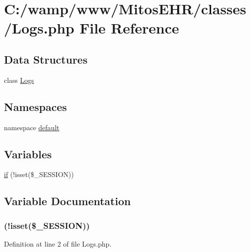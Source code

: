 \hypertarget{_logs_8php}{\section{\-C\-:/wamp/www/\-Mitos\-E\-H\-R/classes/\-Logs.php \-File \-Reference}
\label{_logs_8php}
}
\subsection*{\-Data \-Structures}
\begin{DoxyCompactItemize}
\item 
class \hyperlink{class_logs}{\-Logs}
\end{DoxyCompactItemize}
\subsection*{\-Namespaces}
\begin{DoxyCompactItemize}
\item 
namespace \hyperlink{namespacedefault}{default}
\end{DoxyCompactItemize}
\subsection*{\-Variables}
\begin{DoxyCompactItemize}
\item 
\hyperlink{_logs_8php_a8ceca98aa29914fd2479a84a8d2242fb}{if} (!isset(\$\-\_\-\-S\-E\-S\-S\-I\-O\-N))
\end{DoxyCompactItemize}


\subsection{\-Variable \-Documentation}
\hypertarget{_logs_8php_a8ceca98aa29914fd2479a84a8d2242fb}{
\subsubsection[{if}]{(!isset(\$\-\_\-\-S\-E\-S\-S\-I\-O\-N))}}\label{_logs_8php_a8ceca98aa29914fd2479a84a8d2242fb}


\-Definition at line 2 of file \-Logs.\-php.

